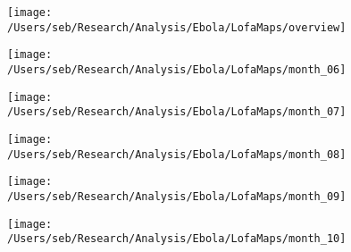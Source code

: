 \documentclass{article}
\begin{document}
\thispagestyle{empty}
\begin{figure}

\begin{minipage}{.33\linewidth}
\centering
\texttt{[image: /Users/seb/Research/Analysis/Ebola/LofaMaps/overview]}
\end{minipage}%
\begin{minipage}{.33\linewidth}
\centering
\texttt{[image: /Users/seb/Research/Analysis/Ebola/LofaMaps/month\_06]}
\end{minipage}%
\begin{minipage}{.33\linewidth}
\centering
\texttt{[image: /Users/seb/Research/Analysis/Ebola/LofaMaps/month\_07]}
\end{minipage}\par\medskip
\begin{minipage}{.33\linewidth}
\centering
\texttt{[image: /Users/seb/Research/Analysis/Ebola/LofaMaps/month\_08]}
\end{minipage}%
\begin{minipage}{.33\linewidth}
\centering
\texttt{[image: /Users/seb/Research/Analysis/Ebola/LofaMaps/month\_09]}
\end{minipage}%
\begin{minipage}{.33\linewidth}
\centering
\texttt{[image: /Users/seb/Research/Analysis/Ebola/LofaMaps/month\_10]}
\end{minipage}\par\medskip

\label{fig:main}
\end{figure}
\end{document}
